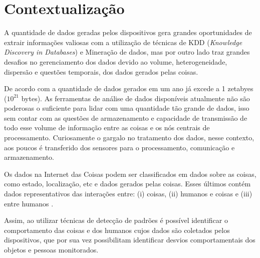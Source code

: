 %

\section{Contextualização} \label{sec:context}

A quantidade de dados geradas pelos dispositivos gera grandes oportunidades de extrair informações valiosas com a utilização de técnicas de KDD (\textit{Knowledge Discovery in Databases}) e Mineração de dados, mas por outro lado traz grandes desafios no gerenciamento dos dados devido ao volume, heterogeneidade, dispersão e questões temporais, dos dados gerados pelas coisas.

De acordo com \cite{000-000} a quantidade de dados gerados em um ano já excede a 1 zetabyes ($10^{21}$ bytes). As ferramentas de análise de dados disponíveis atualmente não são poderosas o suficiente para lidar com uma quantidade tão grande de dados, isso sem contar com as questões de armazenamento e capacidade de transmissão de todo esse volume de informação entre as coisas e os nós centrais de processamento. Curiosamente o gargalo no tratamento dos dados, nesse contexto, aos poucos é transferido dos sensores para o processamento, comunicação e armazenamento.

Os dados na Internet das Coisas podem ser classificados em dados sobre as coisas, como estado, localização, etc e dados gerados pelas coisas. Esses últimos contém dados representativos das interações entre: (i) coisas, (ii) humanos e coisas e (iii) entre humanos \cite{000-018}. 

Assim, ao utilizar técnicas de detecção de padrões é possível identificar o comportamento das coisas e dos humanos cujos dados são coletados pelos dispositivos, que por sua vez possibilitam identificar desvios comportamentais dos objetos e pessoas monitorados. 

